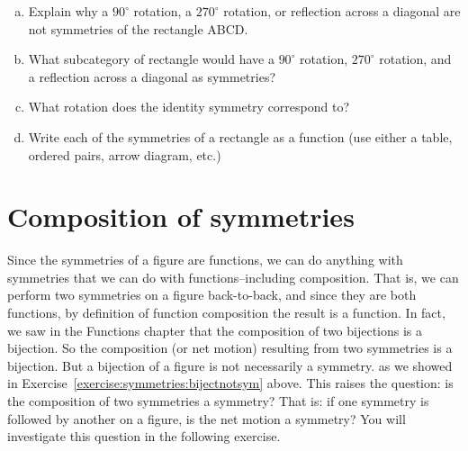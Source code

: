 \begin{exercise}{10}
\begin{enumerate}[(a)]
\item
Explain why a $90^\circ$ rotation, a $270^\circ$ rotation, or reflection across a diagonal are not symmetries  of the rectangle ABCD.
\item
What subcategory of rectangle would have a $90^\circ$ rotation, $270^\circ$ rotation, and a reflection across a diagonal as symmetries?
\item
What rotation does the identity symmetry correspond to?
\item
Write each of the symmetries of a rectangle as a function (use either a table, ordered pairs, arrow diagram, etc.)
\end{enumerate}
\end{exercise}  


\section{Composition of symmetries}

Since the symmetries of a figure are functions, we can do anything with symmetries that we can do with functions--including composition.  That is,  we can perform two symmetries on a figure back-to-back, and since they are both functions, by definition of function composition the result is a function.  In fact, we saw in the Functions chapter that the composition of two bijections is a bijection.  So the composition (or net motion) resulting from two symmetries is a bijection.  But a bijection of a figure is not necessarily a symmetry. as we showed in Exercise~\ref{exercise:symmetries:bijectnotsym} above.  This raises the question:  is the composition of two symmetries a symmetry?  That is: if one symmetry is followed by another on a figure, is the net motion a symmetry?  You will investigate this question in the following exercise.



